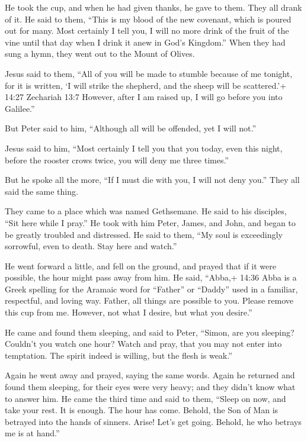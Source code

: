  He took the cup, and when he had given thanks, he gave to
them. They all drank of it.  He said to them, ``This is my
blood of the new covenant, which is poured out for many. 
Most certainly I tell you, I will no more drink of the fruit of the vine
until that day when I drink it anew in God's Kingdom.'' 
When they had sung a hymn, they went out to the Mount of Olives.

 Jesus said to them, ``All of you will be made to stumble
because of me tonight, for it is written, `I will strike the shepherd,
and the sheep will be scattered.'+ 14:27 Zechariah 13:7 
However, after I am raised up, I will go before you into Galilee.''

 But Peter said to him, ``Although all will be offended,
yet I will not.''

 Jesus said to him, ``Most certainly I tell you that you
today, even this night, before the rooster crows twice, you will deny me
three times.''

 But he spoke all the more, ``If I must die with you, I
will not deny you.'' They all said the same thing.

 They came to a place which was named Gethsemane. He said
to his disciples, ``Sit here while I pray.''  He took with
him Peter, James, and John, and began to be greatly troubled and
distressed.  He said to them, ``My soul is exceedingly
sorrowful, even to death. Stay here and watch.''

 He went forward a little, and fell on the ground, and
prayed that if it were possible, the hour might pass away from him.
 He said, ``Abba,+ 14:36 Abba is a Greek spelling for the
Aramaic word for ``Father'' or ``Daddy'' used in a familiar, respectful,
and loving way. Father, all things are possible to you. Please remove
this cup from me. However, not what I desire, but what you desire.''

 He came and found them sleeping, and said to Peter,
``Simon, are you sleeping? Couldn't you watch one hour? 
Watch and pray, that you may not enter into temptation. The spirit
indeed is willing, but the flesh is weak.''

 Again he went away and prayed, saying the same words.
 Again he returned and found them sleeping, for their eyes
were very heavy; and they didn't know what to answer him. 
He came the third time and said to them, ``Sleep on now, and take your
rest. It is enough. The hour has come. Behold, the Son of Man is
betrayed into the hands of sinners.  Arise! Let's get
going. Behold, he who betrays me is at hand.''

